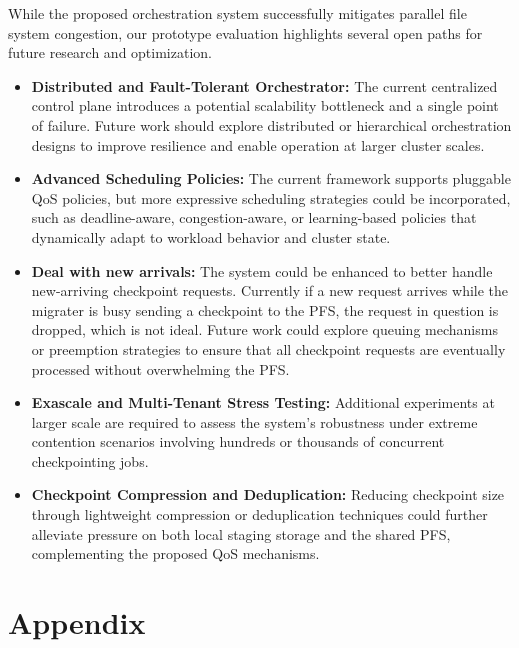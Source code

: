 \documentclass[sigplan,twocolumn,10pt,nonacm]{acmart}
\begin{document}
While the proposed orchestration system successfully mitigates parallel file system congestion,
our prototype evaluation highlights several open paths for future research and optimization.

\begin{itemize}
    \item \textbf{Distributed and Fault-Tolerant Orchestrator:}
    The current centralized control plane introduces a potential scalability bottleneck and a single point of failure. Future work should explore distributed or
    hierarchical orchestration designs to improve resilience and enable operation at larger cluster scales.

    \item \textbf{Advanced Scheduling Policies:}
    The current framework supports pluggable QoS policies, but more expressive scheduling strategies could be incorporated, such as deadline-aware, congestion-aware,
    or learning-based policies that dynamically adapt to workload behavior and cluster state.

    \item \textbf{Deal with new arrivals:}
    The system could be enhanced to better handle new-arriving checkpoint requests. Currently if a new request arrives while the migrater is busy sending a checkpoint to the PFS,
    the request in question is dropped, which is not ideal. Future work could explore queuing mechanisms or preemption strategies to ensure that all checkpoint requests are
    eventually processed without overwhelming the PFS.

    \item \textbf{Exascale and Multi-Tenant Stress Testing:}
    Additional experiments at larger scale are required to assess the system’s robustness under extreme contention scenarios involving hundreds or thousands of concurrent
    checkpointing jobs.

    \item \textbf{Checkpoint Compression and Deduplication:}
    Reducing checkpoint size through lightweight compression or deduplication techniques could further alleviate pressure on both local staging storage and the shared PFS,
    complementing the proposed QoS mechanisms.

\end{itemize}




\clearpage
\onecolumn
\appendix
\section*{Appendix}
\end{document}
